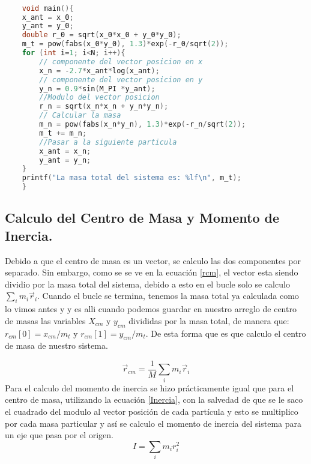 \documentclass[12pt]{article}
\begin{document}
\begin{lstlisting}[language=C, caption={Calculo de la masa.}, style=mystyle]

    void main(){
    x_ant = x_0;
    y_ant = y_0;
    double r_0 = sqrt(x_0*x_0 + y_0*y_0);
    m_t = pow(fabs(x_0*y_0), 1.3)*exp(-r_0/sqrt(2));
    for (int i=1; i<N; i++){
        // componente del vector posicion en x
        x_n = -2.7*x_ant*log(x_ant);
        // componente del vector posicion en y
        y_n = 0.9*sin(M_PI *y_ant);
        //Modulo del vector posicion
        r_n = sqrt(x_n*x_n + y_n*y_n);
        // Calcular la masa
        m_n = pow(fabs(x_n*y_n), 1.3)*exp(-r_n/sqrt(2));
        m_t += m_n;
        //Pasar a la siguiente particula
        x_ant = x_n;
        y_ant = y_n;
    }
    printf("La masa total del sistema es: %lf\n", m_t);   
    }
    \end{lstlisting}

\subsection{Calculo del Centro de Masa y Momento de Inercia.}

Debido a que el centro de masa es un vector, se calculo las dos componentes por separado. Sin embargo, como se se ve en la ecuación \ref{rcm}, el vector esta siendo dividio por la masa total del sistema, debido a esto en el bucle solo se calculo $\sum_i m_i \vec{r}_i$. Cuando el bucle se termina, tenemos la masa total ya calculada como lo vimos antes y y es alli cuando podemos guardar  en nuestro arreglo de centro de masas las variables $X_{cm}$ y $y_{cm}$ divididas por la masa total, de manera que: $r_{cm} [0] = x_{cm} / m_t $ y $r_{cm} [1] = y_{cm}/ m_t $. De esta forma que es que calculo el centro de masa de nuestro sistema.

\begin{equation}
    \label{rcm}
    \Vec{r}_{cm} = \frac{1}{M} \sum_i m_i \vec{r}_i
\end{equation}
Para el calculo del momento de inercia se hizo prácticamente igual que para el centro de masa, utilizando la ecuación \ref{Inercia}, con la salvedad de que se le saco el cuadrado del modulo al vector posición de cada partícula y esto se multiplico por cada masa particular y así se calculo el momento de inercia del sistema para un eje que pasa por el origen. 
\begin{equation}
    \label{Inercia}
    I =  \sum_i m_i r^{2}_{i}
\end{equation}
\end{document}

